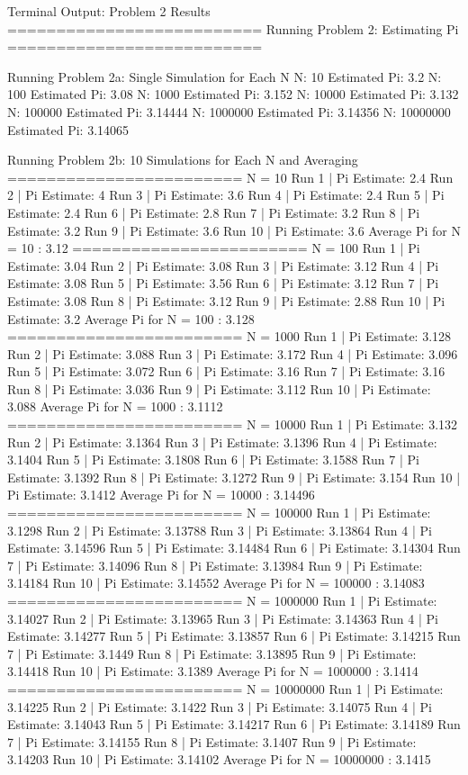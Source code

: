 \documentclass{article}
\begin{document}
\begin{outputbox}{Terminal Output: Problem 2 Results}
    ==========================
Running Problem 2: Estimating Pi
==========================

Running Problem 2a: Single Simulation for Each N
N: 10 Estimated Pi: 3.2
N: 100 Estimated Pi: 3.08
N: 1000 Estimated Pi: 3.152
N: 10000 Estimated Pi: 3.132
N: 100000 Estimated Pi: 3.14444
N: 1000000 Estimated Pi: 3.14356
N: 10000000 Estimated Pi: 3.14065

Running Problem 2b: 10 Simulations for Each N and Averaging
========================
N = 10
Run 1 | Pi Estimate: 2.4
Run 2 | Pi Estimate: 4
Run 3 | Pi Estimate: 3.6
Run 4 | Pi Estimate: 2.4
Run 5 | Pi Estimate: 2.4
Run 6 | Pi Estimate: 2.8
Run 7 | Pi Estimate: 3.2
Run 8 | Pi Estimate: 3.2
Run 9 | Pi Estimate: 3.6
Run 10 | Pi Estimate: 3.6
Average Pi for N = 10 : 3.12
========================
N = 100
Run 1 | Pi Estimate: 3.04
Run 2 | Pi Estimate: 3.08
Run 3 | Pi Estimate: 3.12
Run 4 | Pi Estimate: 3.08
Run 5 | Pi Estimate: 3.56
Run 6 | Pi Estimate: 3.12
Run 7 | Pi Estimate: 3.08
Run 8 | Pi Estimate: 3.12
Run 9 | Pi Estimate: 2.88
Run 10 | Pi Estimate: 3.2
Average Pi for N = 100 : 3.128
========================
N = 1000
Run 1 | Pi Estimate: 3.128
Run 2 | Pi Estimate: 3.088
Run 3 | Pi Estimate: 3.172
Run 4 | Pi Estimate: 3.096
Run 5 | Pi Estimate: 3.072
Run 6 | Pi Estimate: 3.16
Run 7 | Pi Estimate: 3.16
Run 8 | Pi Estimate: 3.036
Run 9 | Pi Estimate: 3.112
Run 10 | Pi Estimate: 3.088
Average Pi for N = 1000 : 3.1112
========================
N = 10000
Run 1 | Pi Estimate: 3.132
Run 2 | Pi Estimate: 3.1364
Run 3 | Pi Estimate: 3.1396
Run 4 | Pi Estimate: 3.1404
Run 5 | Pi Estimate: 3.1808
Run 6 | Pi Estimate: 3.1588
Run 7 | Pi Estimate: 3.1392
Run 8 | Pi Estimate: 3.1272
Run 9 | Pi Estimate: 3.154
Run 10 | Pi Estimate: 3.1412
Average Pi for N = 10000 : 3.14496
========================
N = 100000
Run 1 | Pi Estimate: 3.1298
Run 2 | Pi Estimate: 3.13788
Run 3 | Pi Estimate: 3.13864
Run 4 | Pi Estimate: 3.14596
Run 5 | Pi Estimate: 3.14484
Run 6 | Pi Estimate: 3.14304
Run 7 | Pi Estimate: 3.14096
Run 8 | Pi Estimate: 3.13984
Run 9 | Pi Estimate: 3.14184
Run 10 | Pi Estimate: 3.14552
Average Pi for N = 100000 : 3.14083
========================
N = 1000000
Run 1 | Pi Estimate: 3.14027
Run 2 | Pi Estimate: 3.13965
Run 3 | Pi Estimate: 3.14363
Run 4 | Pi Estimate: 3.14277
Run 5 | Pi Estimate: 3.13857
Run 6 | Pi Estimate: 3.14215
Run 7 | Pi Estimate: 3.1449
Run 8 | Pi Estimate: 3.13895
Run 9 | Pi Estimate: 3.14418
Run 10 | Pi Estimate: 3.1389
Average Pi for N = 1000000 : 3.1414
========================
N = 10000000
Run 1 | Pi Estimate: 3.14225
Run 2 | Pi Estimate: 3.1422
Run 3 | Pi Estimate: 3.14075
Run 4 | Pi Estimate: 3.14043
Run 5 | Pi Estimate: 3.14217
Run 6 | Pi Estimate: 3.14189
Run 7 | Pi Estimate: 3.14155
Run 8 | Pi Estimate: 3.1407
Run 9 | Pi Estimate: 3.14203
Run 10 | Pi Estimate: 3.14102
Average Pi for N = 10000000 : 3.1415


\end{outputbox}
\end{document}
